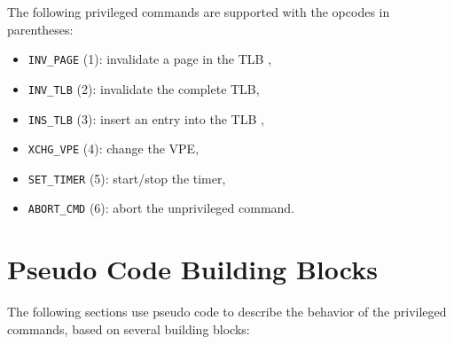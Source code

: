 The following privileged commands are supported with the opcodes in parentheses:

\begin{itemize}
  \item \texttt{INV\_PAGE} (1): invalidate a page in the TLB ,
  \item \texttt{INV\_TLB} (2): invalidate the complete TLB,
  \item \texttt{INS\_TLB} (3): insert an entry into the TLB \extend{},
  \item \texttt{XCHG\_VPE} (4): change the VPE,
  \item \texttt{SET\_TIMER} (5): start/stop the timer,
  \item \texttt{ABORT\_CMD} (6): abort the unprivileged command.
\end{itemize}

\section{Pseudo Code Building Blocks}

The following sections use pseudo code to describe the behavior of the privileged commands, based on
several building blocks:

